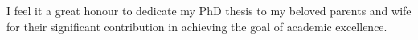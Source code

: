 \begin{dedication}
I feel it a great honour to dedicate my PhD thesis to my beloved parents and wife
for their significant contribution in achieving the goal of academic excellence.
\end{dedication}